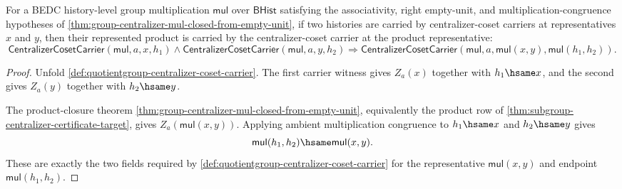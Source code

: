 

\begin{theorem}
\label{thm:quotientgroup-centralizer-coset-carrier-representative-product}
For a BEDC history-level group multiplication $\mathsf{mul}$ over
$\mathsf{BHist}$ satisfying the associativity, right empty-unit, and
multiplication-congruence hypotheses of
\autoref{thm:group-centralizer-mul-closed-from-empty-unit}, if two histories
are carried by centralizer-coset carriers at representatives $x$ and $y$, then
their represented product is carried by the centralizer-coset carrier at the
product representative:
$$
\mathsf{CentralizerCosetCarrier}(\mathsf{mul},a,x,h_1)
\wedge
\mathsf{CentralizerCosetCarrier}(\mathsf{mul},a,y,h_2)
\Longrightarrow
\mathsf{CentralizerCosetCarrier}(\mathsf{mul},a,\mathsf{mul}(x,y),
\mathsf{mul}(h_1,h_2)).
$$
\end{theorem}
\begin{proof}
Unfold \autoref{def:quotientgroup-centralizer-coset-carrier}. The first
carrier witness gives $Z_a(x)$ together with $h_1\hsame x$, and the second
gives $Z_a(y)$ together with $h_2\hsame y$.

The product-closure theorem
\autoref{thm:group-centralizer-mul-closed-from-empty-unit}, equivalently the
product row of \autoref{thm:subgroup-centralizer-certificate-target}, gives
$Z_a(\mathsf{mul}(x,y))$. Applying ambient multiplication congruence to
$h_1\hsame x$ and $h_2\hsame y$ gives
$$
\mathsf{mul}(h_1,h_2)\hsame\mathsf{mul}(x,y).
$$
These are exactly the two fields required by
\autoref{def:quotientgroup-centralizer-coset-carrier} for the representative
$\mathsf{mul}(x,y)$ and endpoint $\mathsf{mul}(h_1,h_2)$.
\end{proof}
